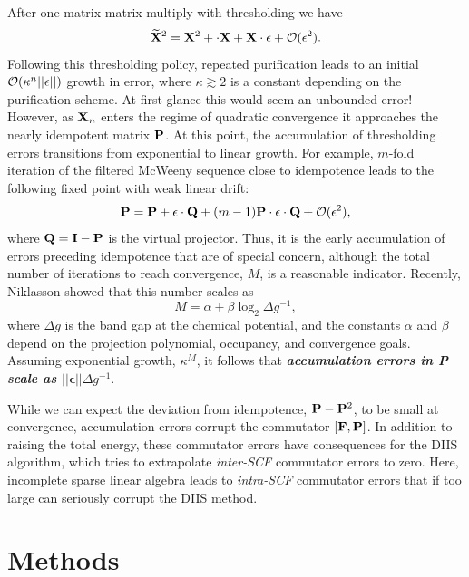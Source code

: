 \commentoutA{\documentclass[prb,aps,twocolumn,twocolumngrid,secnumarabic]{revtex4}}
\begin{document}
After one matrix-matrix multiply with thresholding we have
\begin{equation}
{\widetilde{ \bf X}}^2 = {\bf X}^2 + \bm{\epsilon}\cdot {\bf X} +{\bf X} 
\cdot \bm{\epsilon}+{\cal O}(\bm{\epsilon}^2).
\end{equation}
Following this thresholding policy, repeated purification leads to an initial 
${\cal O}(  \kappa^n ||\bm{\epsilon}||)$ growth in error, where  $\kappa \gtrsim 2$ is 
a constant depending on the purification scheme.  At first glance this would seem 
an unbounded error! However,  as ${\bf X}_n$ enters the regime of quadratic 
convergence it approaches the nearly idempotent matrix ${\bf P}$.  At this point, 
the accumulation  of thresholding errors transitions from exponential to linear growth. 
For example,  $m$-fold iteration of the filtered McWeeny sequence 
close to idempotence leads to the following fixed point with weak linear drift:
\begin{equation}
{\bf P}={\bf P}+\bm{\epsilon} \cdot {\bf Q}+ (m-1){\bf P}\cdot \bm{\epsilon} \cdot{\bf Q} 
+ {\cal O}(\bm{\epsilon}^2),
\end{equation}
where ${\bf Q}={\bf I}-{\bf P}$ is the virtual projector.  Thus, it is the early accumulation of 
errors preceding idempotence that are of special concern, although the  total number of 
iterations to reach convergence, $M$, is a reasonable indicator.   Recently, 
Niklasson \cite{ANiklasson02A} showed that this number scales as
\begin{equation}
\label{Mlog}
M = \alpha + \beta \log_2 \Delta g^{-1},
\end{equation}
where $\Delta g$ is the band gap at the chemical potential, and
the constants $\alpha$ and $\beta$ depend on the projection polynomial, occupancy, and
convergence goals. Assuming exponential growth, $\kappa^M$, it follows that 
{\bf \em accumulation errors in {\bf P} scale as $||\bm{\epsilon}|| \Delta g^{-1}$}.  

While we can expect the deviation from idempotence, ${\bf P} - {\bf P}^2$, to be small at 
convergence, accumulation errors corrupt the commutator $[ {\bf F},{\bf P} ]$.  In addition
to raising the total energy, these commutator errors have consequences for the 
DIIS\cite{PPulay80,PPulay82} algorithm, which tries to extrapolate {\em inter-SCF} commutator 
errors to zero.  Here, incomplete sparse linear algebra leads to {\em intra-SCF} commutator 
errors that if too large can seriously corrupt the DIIS method. 

\section{Methods}
\end{document}
